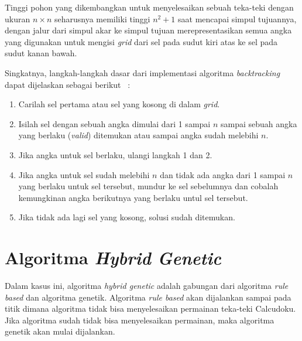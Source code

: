 Tinggi pohon yang dikembangkan untuk menyelesaikan sebuah teka-teki dengan ukuran \begin{math}n \times n\end{math} seharusnya memiliki tinggi \begin{math}n^2+1\end{math} saat mencapai simpul tujuannya, dengan jalur dari simpul akar ke simpul tujuan merepresentasikan semua angka yang digunakan untuk mengisi \textit{grid} dari sel pada sudut kiri atas ke sel pada sudut kanan bawah.

Singkatnya, langkah-langkah dasar dari implementasi algoritma \textit{backtracking} dapat dijelaskan sebagai berikut ~\cite{fahda:16:backtracking}:
\begin{enumerate}
\item Carilah sel pertama atau sel yang kosong di dalam \textit{grid}.
\item Isilah sel dengan sebuah angka dimulai dari 1 sampai \begin{math}n\end{math} sampai sebuah angka yang berlaku (\textit{valid}) ditemukan atau sampai angka sudah melebihi \begin{math}n\end{math}.
\item Jika angka untuk sel berlaku, ulangi langkah 1 dan 2.
\item Jika angka untuk sel sudah melebihi \begin{math}n\end{math} dan tidak ada angka dari 1 sampai \begin{math}n\end{math} yang berlaku untuk sel tersebut, mundur ke sel sebelumnya dan cobalah kemungkinan angka berikutnya yang berlaku untul sel tersebut.
\item Jika tidak ada lagi sel yang kosong, solusi sudah ditemukan.
\end{enumerate}

\section{Algoritma \textit{Hybrid Genetic} ~\cite{johanna:12:hybrid}}
\label{sec:hybridgenetic}

Dalam kasus ini, algoritma \textit{hybrid genetic} adalah gabungan dari algoritma \textit{rule based} dan algoritma genetik. Algoritma \textit{rule based} akan dijalankan sampai pada titik dimana algoritma tidak bisa menyelesaikan permainan teka-teki Calcudoku. Jika algoritma sudah tidak bisa menyelesaikan permainan, maka algoritma genetik akan mulai dijalankan.

